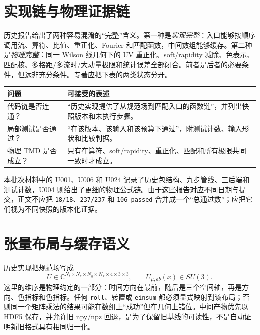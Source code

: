 \section{实现链与物理证据链}

历史报告给出了两种容易混淆的“完整”含义。第一种是\emph{实现完整}：入口能够按顺序调用流、算符、比值、重正化、Fourier 和匹配函数，中间数组能够缓存。第二种是\emph{物理完整}：同一 Wilson 线几何下的 UV 重正化、soft/rapidity 减除、色表示、匹配核、多格距/多流时/大动量极限和统计误差全部闭合。前者是后者的必要条件，但远非充分条件。专著应把下表的两类状态分开。

\begin{center}
\small
\begin{tabularx}{\textwidth}{>{\raggedright\arraybackslash}p{3.2cm}X}
\toprule
问题 & 可接受的表述\\
\midrule
代码链是否连通？ & “历史实现提供了从规范场到匹配入口的函数链”，并列出快照版本和未执行步骤。\\
局部测试是否通过？ & “在该版本、该输入和该预算下通过”，附测试计数、输入形状和比较判据。\\
物理 TMD 是否成立？ & 只有在算符、soft/rapidity、重正化、匹配和所有极限共同一致时才成立。\\
\bottomrule
\end{tabularx}
\end{center}

本批次材料中的 U001、U006 和 U024 记录了历史包结构、九步管线、三后端和测试计数，U004 则给出了更细的物理公式链。由于这些报告对应不同日期与提交，正文不应把 \texttt{18/18}、\texttt{237/237} 和 \texttt{106 passed} 合并成一个“总通过数”；应把它们视为不同快照的版本化证据。

\section{张量布局与缓存语义}

历史实现把规范场写成
\begin{equation}
  U \in \mathbb C^{N_t\times N_z\times N_y\times N_x\times 4\times 3\times 3},
  \qquad U_{\mu,ab}(x)\in SU(3).
  \label{eq:b07-layout}
\end{equation}
这里的维序是物理约定的一部分：时间方向在最前，随后是三个空间轴，再是方向、色指标和色指标。任何 \texttt{roll}、转置或 \texttt{einsum} 都必须显式映射到该布局；否则同一个矩阵乘法的结果可能在数组上“成功”但在几何上错位。中间产物优先以 HDF5 保存，并允许旧 npy/npz 回退，是为了保留旧基线的可读性，不是自动证明新旧格式具有相同归一化。

